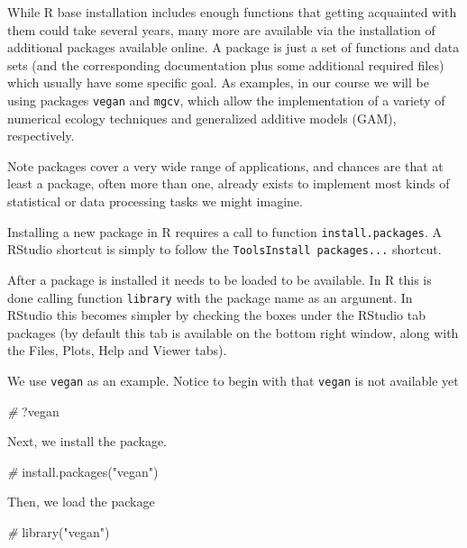 \documentclass[
]{article}
\newenvironment{Shaded}{\begin{snugshade}}{\end{snugshade}}
\newcommand{\CommentTok}[1]{\textcolor[rgb]{0.56,0.35,0.01}{\textit{#1}}}
\newcommand{\FunctionTok}[1]{\textcolor[rgb]{0.00,0.00,0.00}{#1}}
\newcommand{\NormalTok}[1]{#1}
\newcommand{\StringTok}[1]{\textcolor[rgb]{0.31,0.60,0.02}{#1}}
\begin{document}
While R base installation includes enough functions that getting
acquainted with them could take several years, many more are available
via the installation of additional packages available online. A package
is just a set of functions and data sets (and the corresponding
documentation plus some additional required files) which usually have
some specific goal. As examples, in our course we will be using packages
\texttt{vegan} and \texttt{mgcv}, which allow the implementation of a
variety of numerical ecology techniques and generalized additive models
(GAM), respectively.

Note packages cover a very wide range of applications, and chances are
that at least a package, often more than one, already exists to
implement most kinds of statistical or data processing tasks we might
imagine.

Installing a new package in R requires a call to function
\texttt{install.packages}. A RStudio shortcut is simply to follow the
\texttt{Tools\textbar{}Install\ packages...} shortcut.

After a package is installed it needs to be loaded to be available. In R
this is done calling function \texttt{library} with the package name as
an argument. In RStudio this becomes simpler by checking the boxes under
the RStudio tab packages (by default this tab is available on the bottom
right window, along with the Files, Plots, Help and Viewer tabs).

We use \texttt{vegan} as an example. Notice to begin with that
\texttt{vegan} is not available yet

\begin{Shaded}
\begin{Highlighting}[]
\CommentTok{\#}
\NormalTok{?vegan}
\end{Highlighting}
\end{Shaded}

Next, we install the package.

\begin{Shaded}
\begin{Highlighting}[]
\CommentTok{\#}
\FunctionTok{install.packages}\NormalTok{(}\StringTok{"vegan"}\NormalTok{)}
\end{Highlighting}
\end{Shaded}

Then, we load the package

\begin{Shaded}
\begin{Highlighting}[]
\CommentTok{\#}
\FunctionTok{library}\NormalTok{(}\StringTok{"vegan"}\NormalTok{)}
\end{Highlighting}
\end{Shaded}
\end{document}
